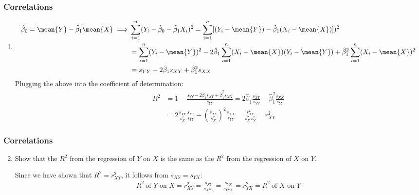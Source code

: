 \begin{frame}
\frametitle{Correlations}

\begin{enumerate}\setcounter{enumi}{0}

\item \askone

\begin{answer}
\begin{align*}
\hat{\beta}_{0}
     = \mean{Y} - \hat{\beta}_{1} \mean{X}
\implies
& \sum_{i=1}^{n}(Y_{i}-\hat{\beta}_{0}-\hat{\beta}_{1}X_{i})^2
     = \sum_{i=1}^{n}[(Y_{i}-\mean{Y})-\hat{\beta}_{1}(X_{i}-\mean{X})])^2\\
    & = \sum_{i=1}^{n}(Y_{i}-\mean{Y})^2
       -2\hat{\beta}_{1}\sum_{i=1}^{n}(X_{i}-\mean{X})(Y_{i}-\mean{Y})
       + \hat{\beta}_{1}^2\sum_{i=1}^{n}(X_{i}-\mean{X})^2\\
    & = s_{YY} -2\hat{\beta}_{1} s_{XY} + \hat{\beta}_{1}^2 s_{XX}
\end{align*}
Plugging the above into the coefficient of determination:
\begin{align*}
R^{2} 
    &  = 1 - \frac{s_{YY} -2\hat{\beta}_{1} s_{XY} + \hat{\beta}_{1}^2 s_{XX}}{s_{YY}} 
      = 2\hat{\beta}_{1} \frac{s_{XY}}{s_{YY}} - \hat{\beta}_{1}^2 \frac{s_{XX}}{s_{YY}}\\
    & = 2 \frac{s_{XY}}{s_{X}^2}\frac{s_{XY}}{s_{YY}} 
         - \left(\frac{s_{XY}}{s_{X}^2}\right)^2 \frac{s_{XX}}{s_{YY}}
      = \frac{s_{XY}^2}{s_{X}^2\,s_{Y}^2} 
      = r_{XY}^2
\end{align*}
\end{answer}

\end{enumerate}
\end{frame}


\begin{frame}
\frametitle{Correlations}

\begin{enumerate}\setcounter{enumi}{1}

\item Show that the $R^2$ from the regression of $Y$ on $X$ is the same as the $R^2$ from the regression of $X$ on $Y$.

\begin{answer}
Since we have shown that $R^2=r^2_{XY}$, it follows from $s_{XY}=s_{YX}$:
\begin{align*}
R^{2} ~\text{of $Y$ on $X$}
  = r_{XY}^2
  = \frac{s_{XY}}{s_{X}s_{Y}}
  = \frac{s_{YX}}{s_{Y}s_{X}}
  = r_{YX}^2
  = R^{2} ~\text{of $X$ on $Y$}
\end{align*}
\end{answer}


\end{enumerate}
\end{frame}


